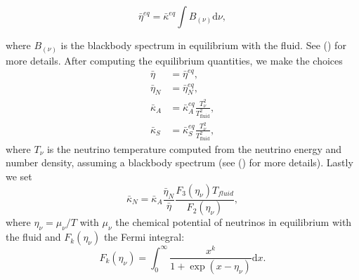 \begin{equation}
\bar \eta^{eq} = \bar\kappa^{eq}\int B_{(\nu)}\mathrm{d}\nu,
\end{equation}

where $B_{(\nu)}$ is the blackbody spectrum in equilibrium with the fluid. See (\cite{foucart2016impact}) for more details.
After computing the equilibrium quantities, we make the choices
%
\begin{align}
  \bar \eta &= \bar \eta^{eq}, \\
  \bar \eta_N &= \bar \eta_N^{eq}, \\
  \bar \kappa_A &= \bar \kappa^{eq}_A\frac{T_\nu^2}{T_{\text{fluid}}^2}, \\
  \bar \kappa_S &= \bar \kappa^{eq}_S\frac{T_\nu^2}{T_{\text{fluid}}^2},
\end{align}
%
where $T_\nu$ is the neutrino temperature computed from the neutrino energy and number density, assuming a blackbody spectrum (see (\cite{foucart2016impact}) for more details). Lastly we set
%
\begin{equation}
\bar \kappa_N = \bar \kappa_A \frac{\bar\eta_N}{\bar\eta}\frac{F_3(\eta_\nu)T_{fluid}}{F_2(\eta_\nu)},
\end{equation}
%
where $\eta_\nu = \mu_\nu/T$ with $\mu_\nu$ the chemical potential of neutrinos in equilibrium with the fluid and $F_k(\eta_\nu)$ the Fermi integral:
%
\begin{equation}
F_k(\eta_\nu) = \int^\infty_0\frac{x^k}{1 + \exp(x - \eta_\nu)}\mathrm{d}x.
\end{equation}
%



